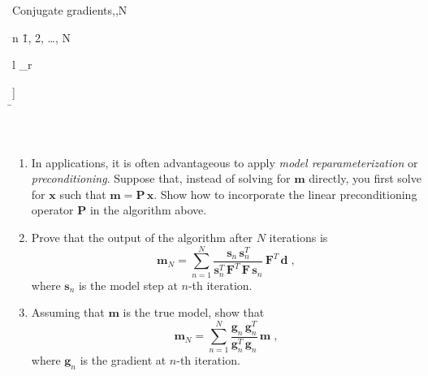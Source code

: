 \begin{enumerate}
\begin{algorithm}{Conjugate gradients}{,,N}
\begin{FOR}{n \= 1, 2, \ldots, N}
\begin{array}{l}
        _r
      \end{array}\right] \\
    \hat{\rho} \= \rho
  \end{FOR} \\        
  \RETURN {}
\end{algorithm}
\begin{enumerate}
\item  In applications, it is often advantageous to apply \emph{model
    reparameterization} or \emph{preconditioning}. Suppose that,
  instead of solving for $\mathbf{m}$ directly, you first solve for
  $\mathbf{x}$ such that $\mathbf{m} = \mathbf{P}\,\mathbf{x}$. Show
  how to incorporate the linear preconditioning operator $\mathbf{P}$
  in the algorithm above.
\item Prove that the output of the algorithm after $N$ iterations is
\begin{equation}
\label{eq:msol}
\mathbf{m}_N = \sum\limits_{n=1}^{N} \frac{\mathbf{s}_n\,\mathbf{s}_n^T}{\mathbf{s}_n^T\,\mathbf{F}^T\,\mathbf{F}\,\mathbf{s}_n}\,\mathbf{F}^T\,\mathbf{d}\;,
\end{equation}
where $\mathbf{s}_n$ is the model step at $n$-th iteration.
\item Assuming that $\mathbf{m}$ is the true model, show that
\begin{equation}
\label{eq:mres}
\mathbf{m}_N = \sum\limits_{n=1}^{N} \frac{\mathbf{g}_n\,\mathbf{g}_n^T}{\mathbf{g}_n^T\,\mathbf{g}_n}\,\mathbf{m}\;,
\end{equation}
where $\mathbf{g}_n$ is the gradient at $n$-th iteration.
\end{enumerate}


\end{enumerate}
